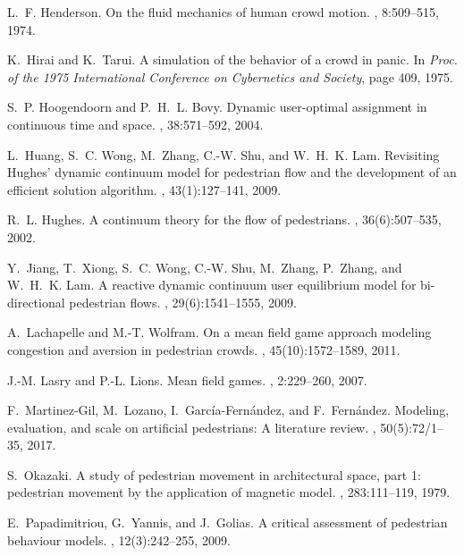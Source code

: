 \documentclass{cmslatex}
\begin{document}
\begin{thebibliography}{}
L.~F. Henderson.
\newblock On the fluid mechanics of human crowd motion.
, 8:509--515, 1974.

K.~Hirai and K.~Tarui.
\newblock A simulation of the behavior of a crowd in panic.
\newblock In {\em Proc. of the 1975 International Conference on Cybernetics and
  Society}, page 409, 1975.

S.~P. Hoogendoorn and P.~H.~L. Bovy.
\newblock Dynamic user-optimal assignment in continuous time and space.
, 38:571--592, 2004.

L.~Huang, S.~C. Wong, M.~Zhang, C.-W. Shu, and W.~H.~K. Lam.
\newblock Revisiting {H}ughes' dynamic continuum model for pedestrian flow and
  the development of an efficient solution algorithm.
, 43(1):127--141,
  2009.

R.~L. Hughes.
\newblock A continuum theory for the flow of pedestrians.
, 36(6):507--535, 2002.

Y.~Jiang, T.~Xiong, S.~C. Wong, C.-W. Shu, M.~Zhang, P.~Zhang, and W.~H.~K.
  Lam.
\newblock A reactive dynamic continuum user equilibrium model for
  bi-directional pedestrian flows.
, 29(6):1541--1555, 2009.

A.~Lachapelle and M.-T. Wolfram.
\newblock On a mean field game approach modeling congestion and aversion in
  pedestrian crowds.
, 45(10):1572--1589, 2011.

J.-M. Lasry and P.-L. Lions. 
\newblock Mean field games.
, 2:229--260, 2007.

F.~Martinez-Gil, M.~Lozano, I.~Garc{\'i}a-Fern{\'a}ndez, and F.~Fern{\'a}ndez.
\newblock Modeling, evaluation, and scale on artificial pedestrians: {A}
  literature review.
, 50(5):72/1--35, 2017.

S.~Okazaki.
\newblock A study of pedestrian movement in architectural space, part 1:
  pedestrian movement by the application of magnetic model.
, 283:111--119, 1979.

E.~Papadimitriou, G.~Yannis, and J.~Golias.
\newblock A critical assessment of pedestrian behaviour models.
, 12(3):242--255, 2009.


\end{thebibliography}
\end{document}
